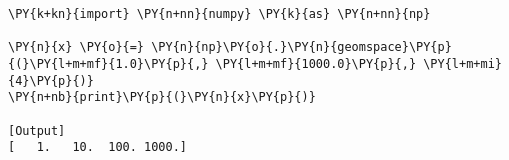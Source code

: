 \begin{Verbatim}[label=\makebox{\href{https://bitbucket.org/lbaldini/statnotes/src/master/snippets/np.geomspace.py}{https://bitbucket.org/.../np.geomspace.py}},commandchars=\\\{\}]
\PY{k+kn}{import} \PY{n+nn}{numpy} \PY{k}{as} \PY{n+nn}{np}

\PY{n}{x} \PY{o}{=} \PY{n}{np}\PY{o}{.}\PY{n}{geomspace}\PY{p}{(}\PY{l+m+mf}{1.0}\PY{p}{,} \PY{l+m+mf}{1000.0}\PY{p}{,} \PY{l+m+mi}{4}\PY{p}{)}
\PY{n+nb}{print}\PY{p}{(}\PY{n}{x}\PY{p}{)}

[Output]
[   1.   10.  100. 1000.]
\end{Verbatim}